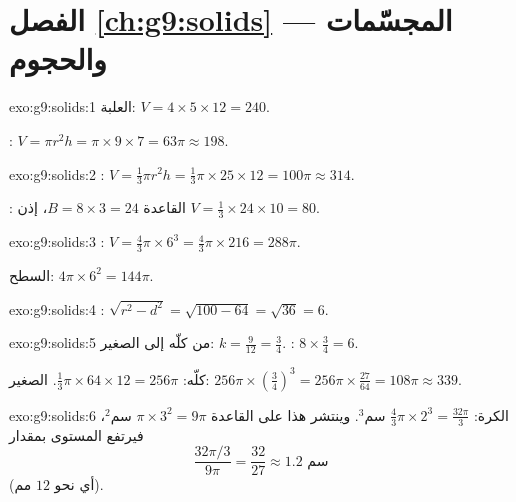 \section*{الفصل \ref{ch:g9:solids} --- المجسّمات والحجوم}

\begin{solution}{exo:g9:solids:1}
العلبة: $V = 4 \times 5 \times 12 = 240$.

: $V = \pi r^2 h = \pi \times 9 \times 7 = 63\pi \approx 198$.
\end{solution}

\begin{solution}{exo:g9:solids:2}
: $V = \frac13 \pi r^2 h = \frac13 \pi \times 25 \times 12 =
100\pi \approx 314$.

:  القاعدة $B = 8 \times 3 = 24$، إذن
$V = \frac13 \times 24 \times 10 = 80$.
\end{solution}

\begin{solution}{exo:g9:solids:3}
: $V = \frac43 \pi \times 6^3 = \frac43 \pi \times 216 = 288\pi$.

 السطح: $4\pi \times 6^2 = 144\pi$.
\end{solution}

\begin{solution}{exo:g9:solids:4}
 : $\sqrt{r^2 - d^2} = \sqrt{100 - 64} = \sqrt{36}
= 6$.
\end{solution}

\begin{solution}{exo:g9:solids:5}
 من  كلّه إلى الصغير:
$k = \frac{9}{12} = \frac34$.  : $8 \times \frac34 = 6$.

  كلّه: $\frac13\pi \times 64 \times 12 = 256\pi$.
  الصغير: $256\pi \times \left(\frac34\right)^3 =
256\pi \times \frac{27}{64} = 108\pi \approx 339$.
\end{solution}

\begin{solution}{exo:g9:solids:6}
 الكرة: $\frac43\pi \times 2^3 = \frac{32\pi}{3}$ سم$^3$.
وينتشر هذا  على  القاعدة $\pi \times 3^2 = 9\pi$ سم$^2$،
فيرتفع المستوى بمقدار
\[
\frac{32\pi/3}{9\pi} = \frac{32}{27} \approx 1.2 \text{ سم}
\]
(أي نحو $12$ مم).
\end{solution}

